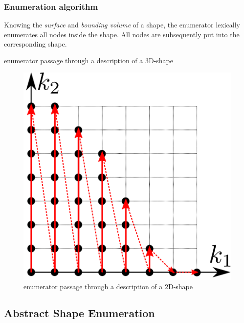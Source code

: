 \documentclass{article}
\begin{document}
\begin{figure}[htbp]
\centering


\end{figure}

\subsubsection{Enumeration algorithm}
Knowing the \emph{surface} and  \emph{bounding volume} of a shape, the enumerator lexically enumerates all nodes inside the shape. All nodes are subsequently put into the corresponding shape.

\begin{algorithm}[H]
  \caption{enumerator passage through a description of a 3D-shape}
\end{algorithm}

\begin{figure}[H]
	\centering
	\includegraphics[]{shape_enumerator}
	\caption{enumerator passage through a description of a 2D-shape}
	\label{fig:shape_example}
\end{figure}

\subsection{Abstract Shape Enumeration}
\end{document}
